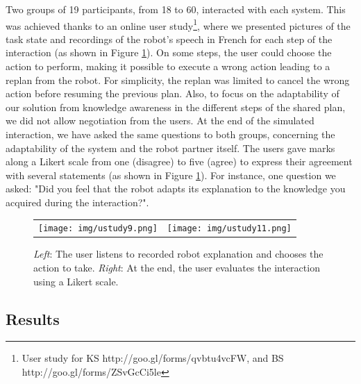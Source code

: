 Two groups of 19 participants, from 18 to 60, interacted with each system. This was achieved thanks to  
an online user study\footnote{User study for KS http://goo.gl/forms/qvbtu4vcFW, and BS http://goo.gl/forms/ZSvGcCi5le}, where we presented pictures of the task state and recordings of the robot's speech in French for each step of the interaction (as shown in Figure \ref{fig:user_study}).
On some steps, the user could choose the action to perform, making it possible to execute a wrong action leading to a replan from the robot. For simplicity, the replan was limited to cancel the wrong action before resuming the previous plan. Also, to focus on the adaptability of our solution from knowledge awareness in the different steps of the shared plan, we did not allow negotiation from the users.
At the end of the simulated interaction, we have asked the same questions to both groups, concerning the adaptability of the system and the robot partner itself. 
The users gave marks along a Likert scale from one (disagree) to five (agree) to express their agreement with several statements (as shown in Figure \ref{fig:user_study}).
For instance, one question we asked: "Did you feel that the robot adapts its explanation to the knowledge you acquired during the interaction?".

\begin{figure}[ht!]
  \vspace{-8pt}
 \centering
 \begin{tabular}{cc}
  \texttt{[image: img/ustudy9.png]} &
  \texttt{[image: img/ustudy11.png]}
 \end{tabular}
  \vspace{-6pt}
 \caption{\textit{Left}: The user listens to recorded robot explanation and chooses the action to take. \textit{Right}: At the end, the user evaluates the interaction using a Likert scale.}
 \label{fig:user_study}
   \vspace{-15pt}
 \end{figure}

\subsection{Results}

